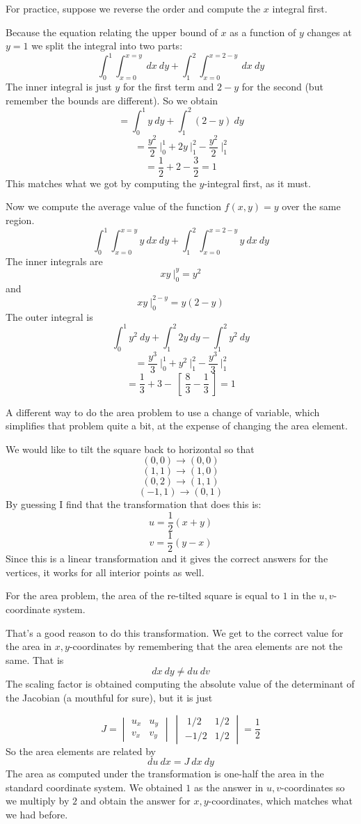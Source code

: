 \documentclass[11pt, oneside]{article}   	%
\begin{document}
For practice, suppose we reverse the order and compute the $x$ integral first.  

Because the equation relating the upper bound of $x$ as a function of $y$ changes at $y=1$ we split the integral into two parts:
\[ \int_0^1 \int_{x=0}^{x=y} \ dx \ dy  + \int_1^2 \int_{x=0}^{x=2-y} \ dx \ dy \]
The inner integral is just $y$ for the first term and $2-y$ for the second (but remember the bounds are different).  So we obtain
\[ = \int_0^1 y \ dy + \int_1^2 (2-y) \ dy \]
\[ = \frac{y^2}{2} \ \bigg |_0^1 + 2y \ \bigg |_1^2 - \frac{y^2}{2} \ \bigg |_1^2 \]
\[ = \frac{1}{2} + 2 - \frac{3}{2} = 1 \]
This matches what we got by computing the $y$-integral first, as it must.

Now we compute the average value of the function $f(x,y) = y$ over the same region.  
\[ \int_0^1 \int_{x=0}^{x=y} y \ dx \ dy  + \int_1^2 \int_{x=0}^{x=2-y} y \ dx \ dy \]
The inner integrals are
\[ xy \ \bigg |_0^y = y^2 \]
and
\[  xy \ \bigg |_0^{2-y} = y(2-y) \]
The outer integral is 
\[ \int_0^1 y^2 \ dy + \int_1^2 2y \ dy - \int_1^2 y^2 \ dy \]
\[ = \frac{y^3}{3} \ \bigg |_0^1 + y^2 \ \bigg |_1^2 - \frac{y^3}{3} \ \bigg |_1^2 \]
\[ = \frac{1}{3} + 3 - \ [ \ \frac{8}{3} - \frac{1}{3} \ ] = 1 \]

A different way to do the area problem to use a change of variable, which simplifies that problem quite a bit, at the expense of changing the area element.

We would like to tilt the square back to horizontal so that
\[ (0,0) \rightarrow (0,0) \]
\[ (1,1) \rightarrow (1,0) \]
\[ (0,2) \rightarrow (1,1) \]
\[ (-1,1) \rightarrow (0,1) \]
By guessing I find that the transformation that does this is:
\[ u = \frac{1}{2} (x+y) \]
\[ v =  \frac{1}{2} (y-x) \]
Since this is a linear transformation and it gives the correct answers for the vertices,   it works for all interior points as well.

For the area problem, the area of the re-tilted square is equal to $1$ in the $u,v$-coordinate system.

That's a good reason to do this transformation.  We get to the correct value for the area in $x,y$-coordinates by remembering that the area elements are not the same.  That is
\[ dx \ dy \ne du \ dv \]
The scaling factor is obtained computing the absolute value of the determinant of the Jacobian (a mouthful for sure), but it is just

\[ 
J = 
\begin{vmatrix}
u_x  &  u_y \\
v_x  &  v_y 
\end{vmatrix} 
\
\begin{vmatrix}
\ 1/2  &  1/2 \\
- 1/2   & 1/2
\end{vmatrix} 
= \frac{1}{2}
\]
So the area elements are related by
\[  du \ dx = J  \ dx \ dy \]
The area as computed under the transformation is one-half the area in the standard coordinate system.  We obtained $1$ as the answer in $u,v$-coordinates so we multiply by $2$ and obtain the answer for $x,y$-coordinates, which matches what we had before.
\end{document}
